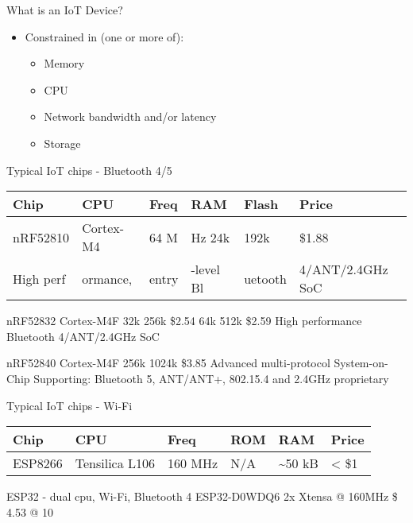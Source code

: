 \begin{frame}{What is an IoT Device?}
\protect\hypertarget{what-is-an-iot-device-1}{}

\begin{itemize}
\tightlist
\item
  Constrained in (one or more of):

  \begin{itemize}
  \tightlist
  \item
    Memory
  \item
    CPU
  \item
    Network bandwidth and/or latency
  \item
    Storage
  \end{itemize}
\end{itemize}

\end{frame}

\begin{frame}{Typical IoT chips - Bluetooth 4/5}
\protect\hypertarget{typical-iot-chips---bluetooth-45}{}

\begin{longtable}[]{@{}llllll@{}}
\toprule
Chip & CPU & Freq & RAM & Flash & Price\tabularnewline
\midrule
\endhead
nRF52810 & Cortex-M4 & 64 M & Hz 24k & 192k & \$1.88\tabularnewline
High perf & ormance, & entry & -level Bl & uetooth & 4/ANT/2.4GHz
SoC\tabularnewline
\bottomrule
\end{longtable}

nRF52832 Cortex-M4F 32k 256k \$2.54 64k 512k \$2.59 High performance
Bluetooth 4/ANT/2.4GHz SoC

nRF52840 Cortex-M4F 256k 1024k \$3.85 Advanced multi-protocol
System-on-Chip Supporting: Bluetooth 5, ANT/ANT+, 802.15.4 and 2.4GHz
proprietary


\end{frame}

\begin{frame}{Typical IoT chips - Wi-Fi}
\protect\hypertarget{typical-iot-chips---wi-fi}{}

\begin{longtable}[]{@{}llllll@{}}
\toprule
Chip & CPU & Freq & ROM & RAM & Price\tabularnewline
\midrule
\endhead
ESP8266 & Tensilica L106 & 160 MHz & N/A & \textasciitilde{}50 kB &
\textless{} \$1\tabularnewline
\bottomrule
\end{longtable}

ESP32 - dual cpu, Wi-Fi, Bluetooth 4 ESP32-D0WDQ6 2x Xtensa @ 160MHz \$
4.53 @ 10


\end{frame}

